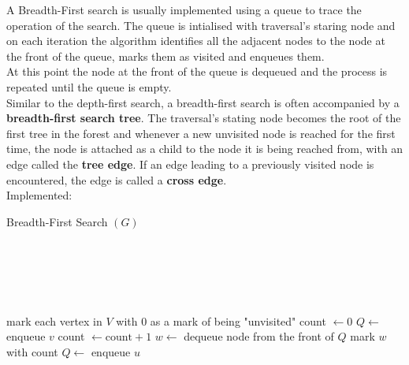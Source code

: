 \documentclass[12pt letter]{report}
\begin{document}
A Breadth-First search is usually implemented using a queue to trace the operation of the search. The queue is
intialised with traversal's staring node and on each iteration the algorithm identifies all the adjacent nodes to the
node at the front of the queue, marks them as visited and enqueues them. \\
At this point the node at the front of the queue is dequeued and the process is repeated until the queue is empty. \\
Similar to the depth-first search, a breadth-first search is often accompanied by a \textbf{breadth-first search tree}.
The traversal's stating node becomes the root of the first tree in the forest and whenever a new unvisited node is
reached for the first time, the node is attached as a child to the node it is being reached from, with an edge called
the \textbf{tree edge}. If an edge leading to a previously visited node is encountered, the edge is called a \textbf{cross
  edge}. \\
Implemented:
\begin{algorithm}[H]
  \caption{Breadth-First Search $ \left( G \right) $}
  \Comment{}\\
   \\
   \\
   \\
  \begin{algorithmic}[1]
    \State mark each vertex in $V$ with $0$ as a mark of being "unvisited"
    \State count $ \gets 0$
    \State  $Q \gets $ enqueue $v$ 
    \State count $ \gets \text{count} + 1$
    \State $w \gets $ dequeue node from the front of $Q$
    \State mark $w$ with count
    \State $Q \gets $ enqueue $u$
    \EndIf
    \EndFor
    \EndWhile
    \EndIf
    \EndFor
  \end{algorithmic}
\end{algorithm}
\end{document}
